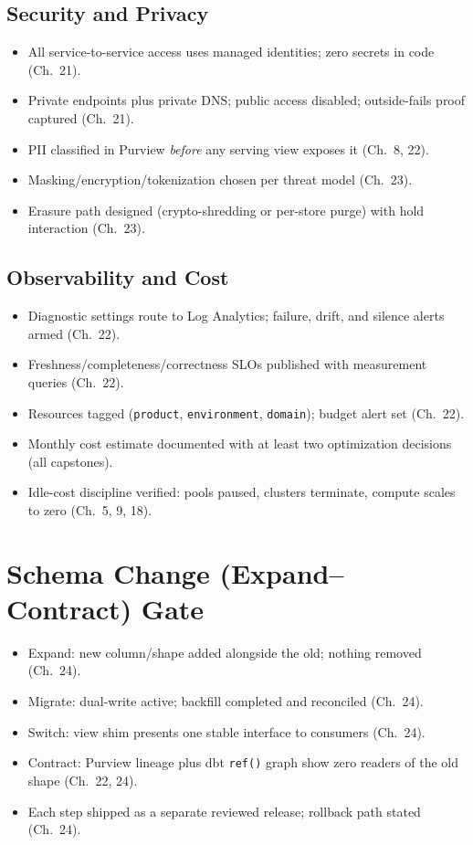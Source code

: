 \subsection*{Security and Privacy}
\begin{itemize}
    \item[$\square$] All service-to-service access uses managed identities; zero secrets in code (Ch.~21).
    \item[$\square$] Private endpoints plus private DNS; public access disabled; outside-fails proof captured (Ch.~21).
    \item[$\square$] PII classified in Purview \emph{before} any serving view exposes it (Ch.~8, 22).
    \item[$\square$] Masking/encryption/tokenization chosen per threat model (Ch.~23).
    \item[$\square$] Erasure path designed (crypto-shredding or per-store purge) with hold interaction (Ch.~23).
\end{itemize}

\subsection*{Observability and Cost}
\begin{itemize}
    \item[$\square$] Diagnostic settings route to Log Analytics; failure, drift, and silence alerts armed (Ch.~22).
    \item[$\square$] Freshness/completeness/correctness SLOs published with measurement queries (Ch.~22).
    \item[$\square$] Resources tagged (\texttt{product}, \texttt{environment}, \texttt{domain}); budget alert set (Ch.~22).
    \item[$\square$] Monthly cost estimate documented with at least two optimization decisions (all capstones).
    \item[$\square$] Idle-cost discipline verified: pools paused, clusters terminate, compute scales to zero (Ch.~5, 9, 18).
\end{itemize}

\section{Schema Change (Expand--Contract) Gate}
\begin{itemize}
    \item[$\square$] Expand: new column/shape added alongside the old; nothing removed (Ch.~24).
    \item[$\square$] Migrate: dual-write active; backfill completed and reconciled (Ch.~24).
    \item[$\square$] Switch: view shim presents one stable interface to consumers (Ch.~24).
    \item[$\square$] Contract: Purview lineage plus dbt \texttt{ref()} graph show zero readers of the old shape (Ch.~22, 24).
    \item[$\square$] Each step shipped as a separate reviewed release; rollback path stated (Ch.~24).
\end{itemize}

